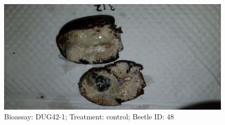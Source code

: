 \documentclass[11pt]{scrartcl}
\begin{document}
\begin{figure}[h!]
    \centering
    \includegraphics[width=\linewidth, height=\textheight, keepaspectratio]{uploads/btl.pm_image.8f9bf227098434cd.4475673432203331325f5265702d3120636f6e747a726f6c2e6a7067.jpg}
    \caption{Bioassay: DUG42-1; Treatment: control; Beetle ID: 48}
\end{figure}
\clearpage
\end{document}
